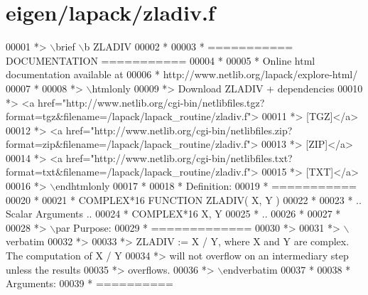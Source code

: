 \hypertarget{eigen_2lapack_2zladiv_8f_source}{}\section{eigen/lapack/zladiv.f}
\label{eigen_2lapack_2zladiv_8f_source}

\begin{DoxyCode}
00001 \textcolor{comment}{*> \(\backslash\)brief \(\backslash\)b ZLADIV}
00002 \textcolor{comment}{*}
00003 \textcolor{comment}{*  =========== DOCUMENTATION ===========}
00004 \textcolor{comment}{*}
00005 \textcolor{comment}{* Online html documentation available at }
00006 \textcolor{comment}{*            http://www.netlib.org/lapack/explore-html/ }
00007 \textcolor{comment}{*}
00008 \textcolor{comment}{*> \(\backslash\)htmlonly}
00009 \textcolor{comment}{*> Download ZLADIV + dependencies }
00010 \textcolor{comment}{*> <a
       href="http://www.netlib.org/cgi-bin/netlibfiles.tgz?format=tgz&filename=/lapack/lapack\_routine/zladiv.f"> }
00011 \textcolor{comment}{*> [TGZ]</a> }
00012 \textcolor{comment}{*> <a
       href="http://www.netlib.org/cgi-bin/netlibfiles.zip?format=zip&filename=/lapack/lapack\_routine/zladiv.f"> }
00013 \textcolor{comment}{*> [ZIP]</a> }
00014 \textcolor{comment}{*> <a
       href="http://www.netlib.org/cgi-bin/netlibfiles.txt?format=txt&filename=/lapack/lapack\_routine/zladiv.f"> }
00015 \textcolor{comment}{*> [TXT]</a>}
00016 \textcolor{comment}{*> \(\backslash\)endhtmlonly }
00017 \textcolor{comment}{*}
00018 \textcolor{comment}{*  Definition:}
00019 \textcolor{comment}{*  ===========}
00020 \textcolor{comment}{*}
00021 \textcolor{comment}{*       COMPLEX*16     FUNCTION ZLADIV( X, Y )}
00022 \textcolor{comment}{* }
00023 \textcolor{comment}{*       .. Scalar Arguments ..}
00024 \textcolor{comment}{*       COMPLEX*16         X, Y}
00025 \textcolor{comment}{*       ..}
00026 \textcolor{comment}{*  }
00027 \textcolor{comment}{*}
00028 \textcolor{comment}{*> \(\backslash\)par Purpose:}
00029 \textcolor{comment}{*  =============}
00030 \textcolor{comment}{*>}
00031 \textcolor{comment}{*> \(\backslash\)verbatim}
00032 \textcolor{comment}{*>}
00033 \textcolor{comment}{*> ZLADIV := X / Y, where X and Y are complex.  The computation of X / Y}
00034 \textcolor{comment}{*> will not overflow on an intermediary step unless the results}
00035 \textcolor{comment}{*> overflows.}
00036 \textcolor{comment}{*> \(\backslash\)endverbatim}
00037 \textcolor{comment}{*}
00038 \textcolor{comment}{*  Arguments:}
00039 \textcolor{comment}{*  ==========}

\end{DoxyCode}
